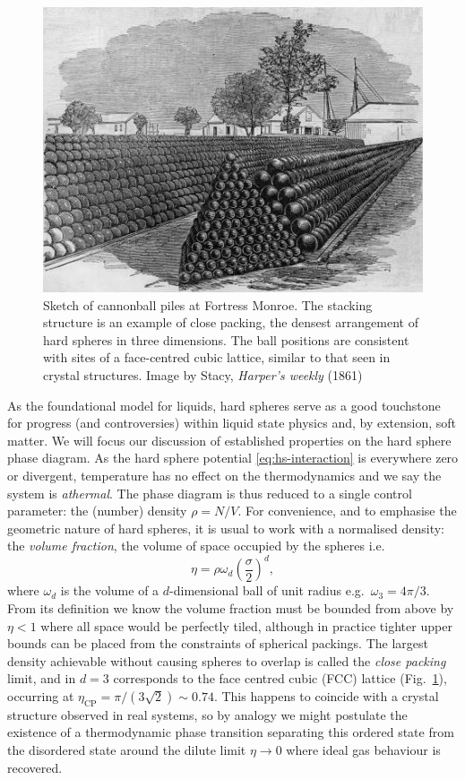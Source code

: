 \documentclass[11pt,twoside]{report}
\begin{document}
\begin{figure}
  \includegraphics[width=0.75\linewidth,outer]{cannonballs}
  \caption[Close packed cannonballs]{
    Sketch of cannonball piles at Fortress Monroe.
    The stacking structure is an example of close packing, the densest arrangement of hard spheres in three dimensions.
    The ball positions are consistent with sites of a face-centred cubic lattice, similar to that seen in crystal structures.
    Image by Stacy, \emph{Harper's weekly} (1861)}
  \label{fig:fcc}
\end{figure}

As the foundational model for liquids, hard spheres serve as a good touchstone for progress (and controversies) within liquid state physics and, by extension, soft matter.
We will focus our discussion of established properties on the hard sphere phase diagram.
As the hard sphere potential \eqref{eq:hs-interaction} is everywhere zero or divergent, temperature has no effect%
on the thermodynamics and we say the system is \emph{athermal}.
The phase diagram is thus reduced to a single control parameter: the (number) density $\rho = N/V$.
For convenience, and to emphasise the geometric nature of hard spheres, it is usual to work with a normalised density: the \emph{volume fraction}, the volume of space occupied by the spheres i.e.\
\begin{equation}\label{eq:hs-volume-fraction}
  \eta
  =
  \rho \omega_d \left( \frac{\sigma}{2}\right)^d,
\end{equation}
where $\omega_d$ is the volume of a $d$-dimensional ball of unit radius e.g.\ $\omega_3 = 4\pi / 3$.
From its definition we know the volume fraction must be bounded from above by $\eta < 1$ where all space would be perfectly tiled, although in practice tighter upper bounds can be placed from the constraints of spherical packings.
The largest density achievable without causing spheres to overlap is called the \emph{close packing} limit, and in $d = 3$ corresponds to the face centred cubic (FCC) lattice (Fig.\ \ref{fig:fcc}), occurring at $\eta_\mathrm{CP} = \pi / (3\sqrt{2}) \sim 0.74$.
This happens to coincide with a crystal structure observed in real systems, so by analogy we might postulate the existence of a thermodynamic phase transition separating this ordered state from the disordered state around the dilute limit $\eta \to 0$ where ideal gas behaviour is recovered.
\end{document}
